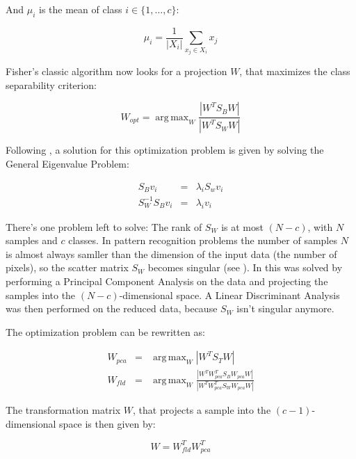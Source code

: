 And $\mu_i$ is the mean of class $i \in \{1,\ldots,c\}$:

\begin{equation}
\mu_i = \frac{1}{|X_i|} \sum_{x_j \in X_i} x_j
\end{equation}

Fisher's classic algorithm now looks for a projection $W$, that maximizes the class separability criterion:

\begin{equation}
W_{opt} = \operatorname{arg\,max}_{W} \frac{|W^T S_B W|}{|W^T S_W W|}
\end{equation}

Following \cite{belhumeru97}, a solution for this optimization problem is given by solving the General Eigenvalue Problem:

\begin{eqnarray}
\label{eqn:general_eigenwert}
S_{B} v_{i} & = & \lambda_{i} S_w v_{i} \nonumber \\
S_{W}^{-1} S_{B} v_{i} & = & \lambda_{i} v_{i}
\end{eqnarray}

There's one problem left to solve: The rank of $S_{W}$ is at most $(N-c)$, with $N$ samples and $c$ classes. In pattern recognition problems the number of samples $N$ is almost always samller than the dimension of the input data (the number of pixels), so the scatter matrix $S_{W}$ becomes singular (see \cite{Raudys1991}). In \cite{belhumeru97} this was solved by performing a Principal Component Analysis on the data and projecting the samples into the $(N-c)$-dimensional space. A Linear Discriminant Analysis was then performed on the reduced data, because $S_{W}$ isn't singular anymore.

The optimization problem can be rewritten as:

\begin{eqnarray}
W_{pca} & = & \operatorname{arg\,max}_{W} |W^T S_T W| \\
W_{fld} & = & \operatorname{arg\,max}_{W} \frac{|W^T W_{pca}^T S_{B} W_{pca} W|}{|W^T W_{pca}^T S_{W} W_{pca} W|}
\end{eqnarray}

The transformation matrix $W$, that projects a sample into the $(c-1)$-dimensional space is then given by:

\begin{equation} \label{eqn:fisherfaces}
W = W_{fld}^{T} W_{pca}^{T}
\end{equation}

